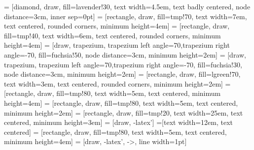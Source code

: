 
 = [diamond, draw, fill=lavender!30, 
    text width=4.5em, text badly centered, node distance=3cm, inner sep=0pt]
 = [rectangle, draw, fill=tmp!70, 
    text width=7em, text centered, rounded corners, minimum height=4em]
 = [rectangle, draw, fill=tmp!40, 
    text width=6em, text centered, rounded corners, minimum height=4em]
 = [draw, trapezium, trapezium left angle=70,trapezium right angle=-70, fill=fuchsia!50, node distance=3cm,
    minimum height=2em]
 = [draw, trapezium, trapezium left angle=70,trapezium right angle=-70, fill=fuchsia!30, node distance=3cm,
    minimum height=2em]
 = [rectangle, draw, fill=lgreen!70, 
    text width=3em, text centered, rounded corners, minimum height=2em]
 = [rectangle, draw, fill=tmp!80, 
    text width=5em, text centered,  minimum height=4em]
 = [rectangle, draw, fill=tmp!80, 
    text width=5em, text centered,  minimum height=2em]
 = [rectangle, draw, fill=tmp!20, 
    text width=25em, text centered, minimum height=3em]
 = [draw, -latex']
=[text width=12em, text centered] 
 = [rectangle, draw, fill=tmp!80, 
    text width=5em, text centered,  minimum height=4em]
 = [draw, -latex', ->, line width=1pt]
\newcommand\centerofmass{%
    \tikz[radius=0.4em,] {%
        \draw[fill=white] (0,0) circle;%
        \fill (0,0) -- ++(0.4em,0) arc [start angle=0,end angle=90] --%
        ++(0,-0.8em) arc [start angle=270, end angle=180];%
        \draw (0,0) circle;%
    }%
}
